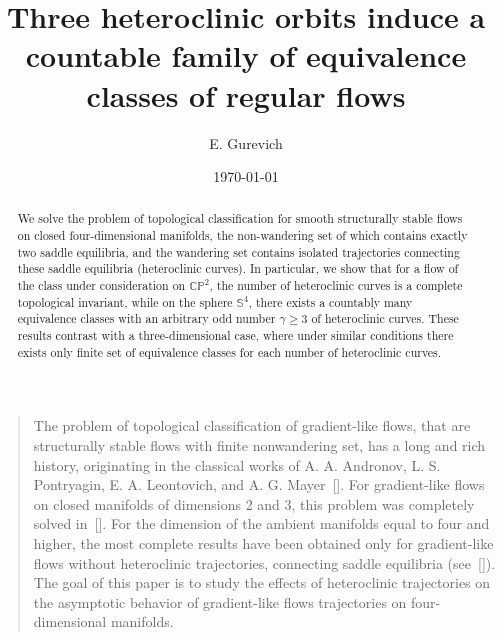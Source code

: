 \documentclass[%
 aip,
 amsmath,amssymb,
preprint,%
]{revtex4-1}
\begin{document}

\title[Three heteroclinic orbits induce a countable family of equivalence classes of regular flows]{Three heteroclinic orbits induce a countable family of equivalence classes of regular flows}
\author{E. Gurevich}
\date{\today}%

\begin{abstract}
We solve the problem of topological classification for smooth structurally stable flows on closed four-dimensional manifolds, the non-wandering set of which  contains exactly two saddle equilibria, and the wandering set contains isolated trajectories connecting these saddle equilibria (heteroclinic curves). In particular, we show that for a flow of the class under consideration on $\mathbb{CP}^2$, the number of heteroclinic curves is a complete topological invariant, while on  the sphere $\mathbb S^4$,  there exists a countably many  equivalence classes with  an arbitrary odd number $\gamma\geq 3$ of heteroclinic curves. These results contrast with a  three-dimensional case, where under similar conditions there exists only finite set of equivalence classes for each number of heteroclinic curves. 
\end{abstract}

\maketitle

\begin{quotation}
The problem of topological classification of gradient-like flows, that are structurally stable flows with finite nonwandering set,  has a long and rich history, originating in the classical works of A. A. Andronov, L. S. Pontryagin, E. A. Leontovich, and A. G. Mayer~[]. For gradient-like flows on closed manifolds of dimensions 2 and 3, this problem was completely solved in~[]. For the  dimension of the  ambient  manifolds equal to  four  and higher, the most complete results have been obtained only for gradient-like flows without  heteroclinic  trajectories, connecting saddle equilibria  (see~[]). The goal of this paper is to study the effects of  heteroclinic trajectories on the asymptotic behavior of gradient-like flows trajectories on four-dimensional manifolds. 
\end{quotation}
\end{document}
